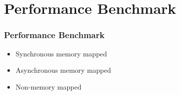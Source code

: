 \section{Performance Benchmark}

\begin{frame}
\frametitle{Performance Benchmark}
\begin{itemize}
\setlength\itemsep{1em}
\item Synchronous memory mapped
\item Asynchronous memory mapped
\item Non-memory mapped
\end{itemize}
\end{frame}
